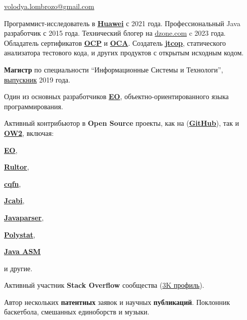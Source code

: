 \documentclass{vl}
\begin{document}
    \vlPrintPhoto{}

    {\bfseries\Large {}}\newline
    \href{mailto:volodya.lombrozo@gmail.com}{volodya.lombrozo@gmail.com}

    \vspace{1em}
    Программист-исследователь в \textbf{\href{https://www.huawei.com}{Huawei}} с 2021 года. \newline
    Профессиональный Java разработчик с 2015 года.\newline
    Технический блогер на \href{https://dzone.com/users/4993224/volodya-lombrozo.html}{dzone.com} c 2023 года.\newline
    Обладатель сертификатов
    \textbf{\href{https://catalog-education.oracle.com/pls/certview/sharebadge?id=87F6A2FE819A5A5AF4120A05900AB28A461EE9A3EE9FBFA02721FADAEB3BCE19}{OCP}} и%
    \textbf{\href{https://www.credly.com/badges/e2d9ddda-20dc-433d-8ab7-18548fd0fd8f/public_url}{OCA}}.\newline
    Создатель \textbf{\href{https://github.com/volodya-lombrozo/jtcop}{jtcop}}, статического анализатора тестового кода,
    и других продуктов с открытым исходным кодом.%

    \textbf{Магистр} по специальности ``Информационные Системы и Технологи'',\newline
    \href{https://en.wikipedia.org/wiki/Saint_Petersburg_Electrotechnical_University}{выпускник} 2019 года.

    Один из основных разработчиков \textbf{\href{https://www.eolang.org}{EO}}, объектно-ориентированного языка
    программирования.

    Активный контрибьютор в \textbf{Open Source} проекты, как
    на (\textbf{\href{https://github.com/volodya-lombrozo}{GitHub}}),
    так и \textbf{\href{https://gitlab.ow2.org/lombrozo}{OW2}}, включая:
    \begin{inparaenum}[1)]
        \item \textbf{\href{https://www.eolang.org}{EO}},
        \item \textbf{\href{https://github.com/yegor256/rultor}{Rultor}},
        \item \textbf{\href{https://github.com/cqfn}{cqfn}},
        \item \textbf{\href{https://github.com/jcabi}{Jcabi}},
        \item \textbf{\href{https://github.com/javaparser/javaparser}{Javaparser}},
        \item \textbf{\href{https://github.com/polystat}{Polystat}},
        \item \textbf{\href{https://gitlab.ow2.org/asm/asm}{Java ASM}}
        \item и другие.
    \end{inparaenum}

    Активный участник \textbf{Stack Overflow} сообщества
    (\href{https://stackoverflow.com/users/10423604/volodya-lombrozo}{3K профиль}).

    Автор нескольких \textbf{патентных} заявок и научных \textbf{публикаций}.\newline
    Поклонник баскетбола, смешанных единоборств и музыки.
\end{document}
